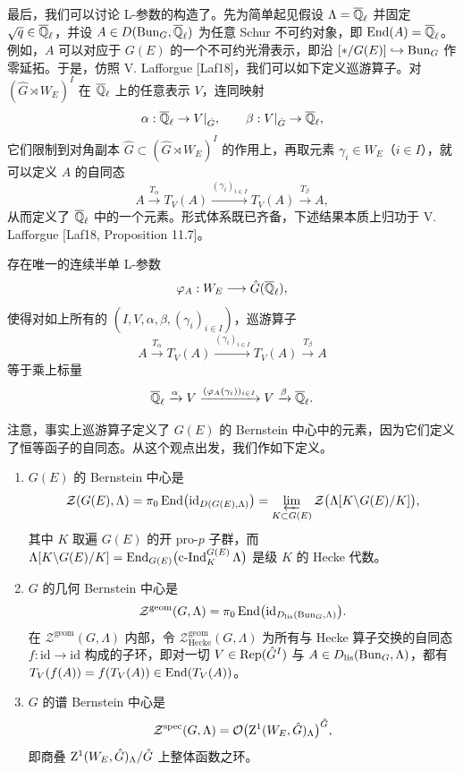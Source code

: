 最后，我们可以讨论 L-参数的构造了。先为简单起见假设 $\Lambda=\overline{\mathbb{Q}}_\ell$ 并固定 $\sqrt q\in\overline{\mathbb{Q}}_\ell$，并设 $A\in D(\mathrm{Bun}_G,\overline{\mathbb{Q}}_\ell)$ 为任意 Schur 不可约对象，即 $\operatorname{End}(A)=\overline{\mathbb{Q}}_\ell$。例如，$A$ 可以对应于 $G(E)$ 的一个不可约光滑表示，即沿 $[*/G(E)]\hookrightarrow\mathrm{Bun}_G$ 作零延拓。于是，仿照 V. Lafforgue [Laf18]，我们可以如下定义巡游算子。对 $(\hat G\rtimes W_E)^I$ 在 $\overline{\mathbb{Q}}_\ell$ 上的任意表示 $V$，连同映射
\[
\alpha:\overline{\mathbb{Q}}_\ell\to V|_{\hat G},\qquad \beta:V|_{\hat G}\to\overline{\mathbb{Q}}_\ell,
\]
它们限制到对角副本 $\hat G\subset(\hat G\rtimes W_E)^I$ 的作用上，再取元素 $\gamma_i\in W_E$（$i\in I$），就可以定义 $A$ 的自同态
\[
A\xrightarrow{T_\alpha}T_V(A)\xrightarrow{(\gamma_i)_{i\in I}}T_V(A)\xrightarrow{T_\beta}A,
\]
从而定义了 $\overline{\mathbb{Q}}_\ell$ 中的一个元素。形式体系既已齐备，下述结果本质上归功于 V. Lafforgue [Laf18, Proposition 11.7]。

\begin{proposition}%
存在唯一的连续半单 L-参数
\[
\varphi_A:W_E\longrightarrow\hat G(\overline{\mathbb{Q}}_\ell),
\]
使得对如上所有的 $(I,V,\alpha,\beta,(\gamma_i)_{i\in I})$，巡游算子
\[
A\xrightarrow{T_\alpha}T_V(A)\xrightarrow{(\gamma_i)_{i\in I}}T_V(A)\xrightarrow{T_\beta}A
\]
等于乘上标量
\[
\overline{\mathbb{Q}}_\ell\xrightarrow{\alpha}V\xrightarrow{(\varphi_A(\gamma_i))_{i\in I}}V\xrightarrow{\beta}\overline{\mathbb{Q}}_\ell.
\]
\end{proposition}

注意，事实上巡游算子定义了 $G(E)$ 的 Bernstein 中心中的元素，因为它们定义了恒等函子的自同态。从这个观点出发，我们作如下定义。

\begin{definition}%
\begin{enumerate}
\item[(i)] $G(E)$ 的 Bernstein 中心是
\[
\mathcal{Z}(G(E),\Lambda)=\pi_0\operatorname{End}\bigl(\mathrm{id}_{D(G(E),\Lambda)}\bigr)=\varprojlim_{K\subset G(E)}\mathcal{Z}\bigl(\Lambda[K\backslash G(E)/K]\bigr),
\]
其中 $K$ 取遍 $G(E)$ 的开 pro-$p$ 子群，而 $\Lambda[K\backslash G(E)/K]=\operatorname{End}_{G(E)}\bigl(\operatorname{c-Ind}_K^{G(E)}\Lambda\bigr)$ 是级 $K$ 的 Hecke 代数。
\item[(ii)] $G$ 的几何 Bernstein 中心是
\[
\mathcal{Z}^{\mathrm{geom}}(G,\Lambda)=\pi_0\operatorname{End}\bigl(\mathrm{id}_{D_{\mathrm{lis}}(\mathrm{Bun}_G,\Lambda)}\bigr).
\]
在 $\mathcal{Z}^{\mathrm{geom}}(G,\Lambda)$ 内部，令 $\mathcal{Z}^{\mathrm{geom}}_{\mathrm{Hecke}}(G,\Lambda)$ 为所有与 Hecke 算子交换的自同态 $f:\mathrm{id}\to\mathrm{id}$ 构成的子环，即对一切 $V\in\mathrm{Rep}(\hat G^I)$ 与 $A\in D_{\mathrm{lis}}(\mathrm{Bun}_G,\Lambda)$，都有 $T_V(f(A))=f(T_V(A))\in\operatorname{End}(T_V(A))$。
\item[(iii)] $G$ 的谱 Bernstein 中心是
\[
\mathcal{Z}^{\mathrm{spec}}(G,\Lambda)=\mathcal{O}\bigl(\mathrm{Z}^1(W_E,\hat G)_\Lambda\bigr)^{\hat G},
\]
即商叠 $\mathrm{Z}^1(W_E,\hat G)_\Lambda/\hat G$ 上整体函数之环。
\end{enumerate}
\end{definition}


